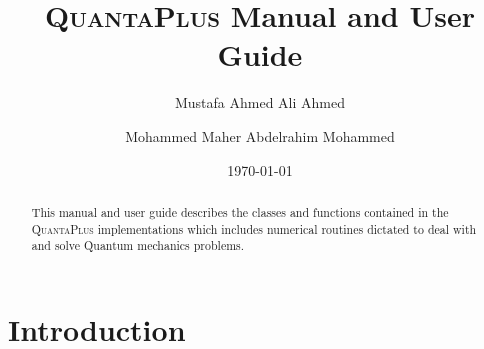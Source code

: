 \documentclass[a4paper,12pt]{article}
\begin{document}
\begin{titlepage}
\title{\textsc{QuantaPlus} Manual and User Guide}
\author{Mustafa Ahmed Ali Ahmed}
\author{Mohammed Maher Abdelrahim Mohammed}

 
 
\date{\today}%

% 
\maketitle
 
\begin{abstract}
	This manual and user guide describes the classes and functions contained
	in the \textsc{QuantaPlus} implementations which includes numerical routines dictated to deal with and solve Quantum mechanics problems.
\end{abstract}
\end{titlepage}
 \tableofcontents
 
 \section{Introduction}\label{introduction}
  
\end{document}
